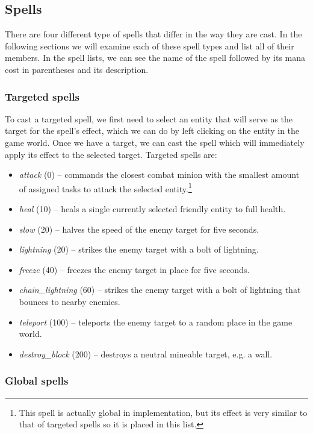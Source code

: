 \subsection{Spells}

There are four different type of spells that differ in the way they are cast. In the following sections we will examine each of these
spell types and list all of their members. In the spell lists, we can see the name of the spell followed by its mana cost in parentheses
and its description.

\subsubsection{Targeted spells}

To cast a targeted spell, we first need to select an entity that will serve as the target for the spell's effect, which we can do by left
clicking on the entity in the game world. Once we have a target, we can cast the spell which will immediately apply its effect to the
selected target. Targeted spells are:

\begin{itemize}
    \item \emph{attack} (0) -- commands the closest combat minion with the smallest amount of assigned tasks to attack the selected
        entity.\footnote{This spell is actually global in implementation, but its effect is very similar to that of targeted spells
        so it is placed in this list.}
    \item \emph{heal} (10) -- heals a single currently selected friendly entity to full health.
    \item \emph{slow} (20) -- halves the speed of the enemy target for five seconds.
    \item \emph{lightning} (20) -- strikes the enemy target with a bolt of lightning.
    \item \emph{freeze} (40) -- freezes the enemy target in place for five seconds.
    \item \emph{chain\_lightning} (60) -- strikes the enemy target with a bolt of lightning that bounces to nearby enemies.
    \item \emph{teleport} (100) -- teleports the enemy target to a random place in the game world.
    \item \emph{destroy\_block} (200) -- destroys a neutral mineable target, e.g. a wall.
\end{itemize}

\subsubsection{Global spells}

